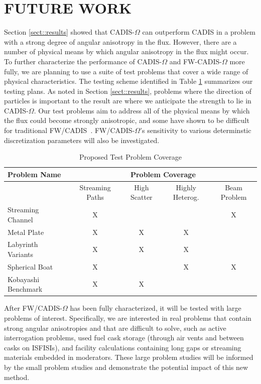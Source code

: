 \documentclass[12pt]{article}
\begin{document}
%
\section{FUTURE WORK} 
\label{sect::future}
 
Section \ref{sect::results} showed that CADIS-$\Omega$ can outperform CADIS in a problem with a strong degree of angular anisotropy in the flux. However, there are a number of physical means by which angular anisotropy in the flux might occur. To further characterize the performance of CADIS-$\Omega$ and FW-CADIS-$\Omega$ more fully, we are planning to use a suite of test problems that cover a wide range of physical characteristics. The testing scheme identified in Table \ref{tab:testprobs} summarizes our testing plans. As noted in Section \ref{sect::results}, problems where the direction of particles is important to the result are where we anticipate the strength to lie in CADIS-$\Omega$. Our test problems aim to address all of the physical means by which the flux could become strongly anisotropic, and some have shown to be difficult for traditional FW/CADIS~\citep{Peplow-ORNL}. FW/CADIS-$\Omega$'s sensitivity to various determinstic discretization parameters will also be investigated. 

 \begin{table}
  \centering
  \caption{Proposed Test Problem Coverage}
  \begin{tabular}{l|cccc}
    \toprule
    Problem Name & \multicolumn{4}{c}{Problem Coverage} \\
    \hline
     & Streaming Paths & High Scatter & Highly Heterog. & Beam Problem \\
    \hline
    Streaming Channel   & X & & & X \\ 
    Metal Plate         & X & X & X &  \\
    Labyrinth Variants  & X & X & X &  \\ 
    Spherical Boat      & X & & X & X \\  
    Kobayashi Benchmark & X & X &  &  \\   
	\bottomrule
  \end{tabular}
  \label{tab:testprobs}
\end{table}

After FW/CADIS-$\Omega$ has been fully characterized, it will be tested with large problems of interest. 
Specifically, we are interested in real problems that contain strong angular anisotropies and that are difficult to solve, such as active interrogation problems, used fuel cask storage (through air vents and between casks on ISFISIs), and facility calculations containing long gaps or streaming materials embedded in moderators. 
These large problem studies will be informed by the small problem studies and demonstrate the potential impact of this new method. 
\end{document}
